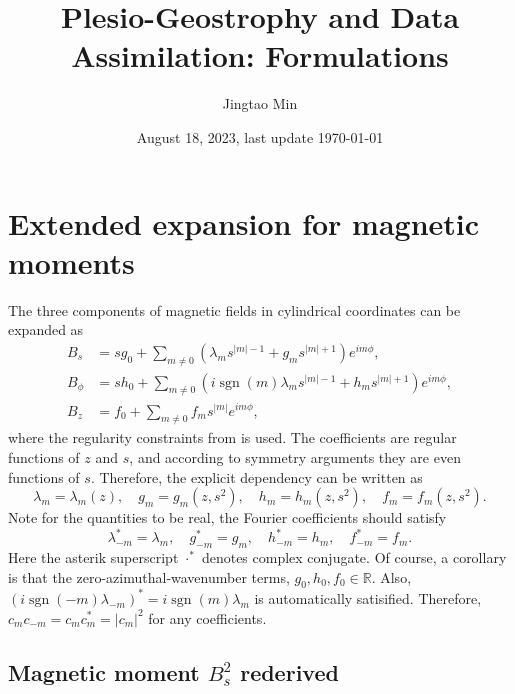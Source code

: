 \documentclass[a4paper, 11pt]{article}
\title{Plesio-Geostrophy and Data Assimilation: Formulations}
\author{Jingtao Min}
\date{August 18, 2023, last update \today}
\DeclareMathOperator{\sgn}{sgn}
\begin{document}
\maketitle

\section{Extended expansion for magnetic moments}

The three components of magnetic fields in cylindrical coordinates can be expanded as
\begin{equation}
\begin{aligned}
    B_s &= s g_0 + \sum_{m\neq 0} \left(\lambda_m s^{|m|-1} + g_m s^{|m|+1}\right) e^{im\phi}, \\ 
    B_\phi &= s h_0 + \sum_{m\neq 0} \left(i \sgn(m) \lambda_m s^{|m|-1} + h_m s^{|m|+1}\right) e^{im\phi}, \\ 
    B_z &= f_0 + \sum_{m\neq 0} f_m s^{|m|} e^{im\phi},
\end{aligned}
\end{equation}
where the regularity constraints from \textcite{lewis_physical_1990} is used. The coefficients are regular functions of $z$ and $s$, and according to symmetry arguments they are even functions of $s$. Therefore, the explicit dependency can be written as
\begin{equation}
    \lambda_m = \lambda_m(z),\quad g_m = g_m(z, s^2),\quad h_m = h_m(z, s^2),\quad f_m = f_m(z, s^2).
\end{equation}
Note for the quantities to be real, the Fourier coefficients should satisfy
\[
    \lambda_{-m}^* = \lambda_m,\quad g_{-m}^* = g_m,\quad h_{-m}^* = h_m,\quad f_{-m}^* = f_m.
\]
Here the asterik superscript $\cdot^*$ denotes complex conjugate. Of course, a corollary is that the zero-azimuthal-wavenumber terms, $g_0, h_0, f_0 \in \mathbb{R}$. Also, $(i \sgn(-m) \lambda_{-m})^* = i\sgn(m) \lambda_m$ is automatically satisified. Therefore, $c_m c_{-m} = c_m c_m^* = |c_m|^2$ for any coefficients.

\subsection{Magnetic moment $B_s^2$ rederived}
\end{document}
